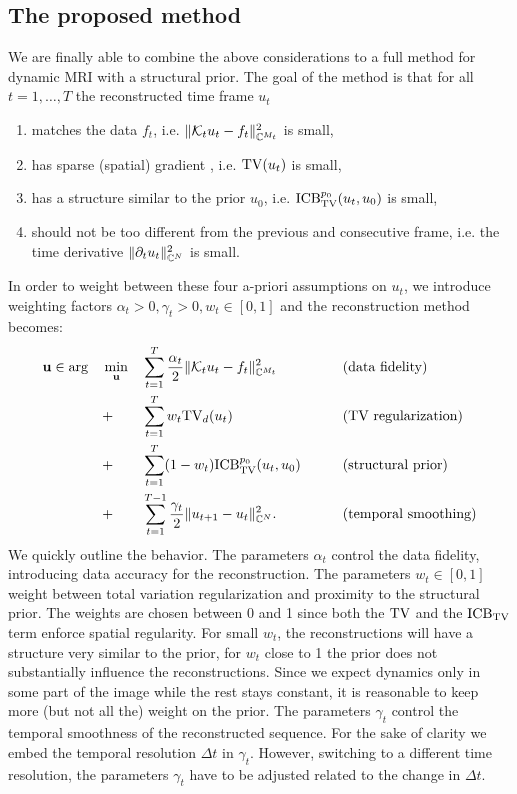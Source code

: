 \subsection{The proposed method}
We are finally able to combine the above considerations to a full method for dynamic MRI with a structural prior. 
The goal of the method is that for all $t = 1, \dots, T$ the reconstructed time frame $u_t$ 
\begin{enumerate}
    \item matches the data $f_t$, i.e. $\| \mathcal{K}_t u_t - f_t \|^2_{\mathbb{C}^{M_t}}$ is small, 
    \item 
     has sparse (spatial) gradient
    , i.e. $\mathrm{TV}(u_t)$ is small, 
    \item has a structure similar to the prior $u_0$, i.e. $\mathrm{ICB}_{\mathrm{TV}}^{p_0}(u_t,u_0)$ is small, 
    \item should not be too different from the previous and consecutive frame, i.e. the time derivative $\| \partial_t u_t \|_{\mathbb{C}^N}^2$ is small.
\end{enumerate}
In order to weight between these four a-priori assumptions on $u_t$, we introduce weighting factors $\alpha_t >0, \gamma_t >0 , w_t \in [0,1]$ and the reconstruction method becomes:
 \begin{alignat}{4}
   &\mathbf{u} \in \arg &&\min_{\mathbf{u}} && \sum_{t=1}^T \frac{\alpha_t}{2} \| \mathcal{K}_t u_t - f_t\|_{\mathbb{C}^{M_t}}^2 \qquad &&\text{(data fidelity)} \notag\\ 
   & && +&& \sum_{t=1}^T w_t \mathrm{TV}_d(u_t) \qquad &&\text{(TV regularization)} \notag \\
   & && +&& \sum_{t=1}^T (1-w_t) \mathrm{ICB}_{\mathrm{TV}}^{p_0}(u_t, u_0 ) \qquad &&\text{(structural prior)} \notag \\
   & && +&& \sum_{t=1}^{T-1} \frac{\gamma_t}{2} \| u_{t+1} - u_t \|_{\mathbb{C}^N}^2. \qquad &&\text{(temporal smoothing)} 
\label{eq:dynamic_recon}
\end{alignat}
% 
We quickly outline the behavior. 
The parameters $\alpha_t$ control the data fidelity, introducing data accuracy for the reconstruction. 
The parameters $w_t \in [0,1]$ weight between total variation regularization and proximity to the structural prior. 
The weights are chosen between 0 and 1 since both the $\mathrm{TV}$ and the $\mathrm{ICB}_{\mathrm{TV}}$ term enforce spatial regularity. 
For small $w_t$, the reconstructions will have a structure very similar to the prior, for $w_t$ close to 1 the prior does not substantially influence the reconstructions. 
Since we expect dynamics only in some part of the image while the rest stays constant, it is reasonable to keep more (but not all the) weight on the prior. 
The parameters $\gamma_t$ control the temporal smoothness of the reconstructed sequence. 
For the sake of clarity we embed the temporal resolution $\Delta t$ in $\gamma_t$. 
However, switching to a different time resolution, the parameters $\gamma_t$ have to be adjusted related to the change in $\Delta t$.
 


 
 
